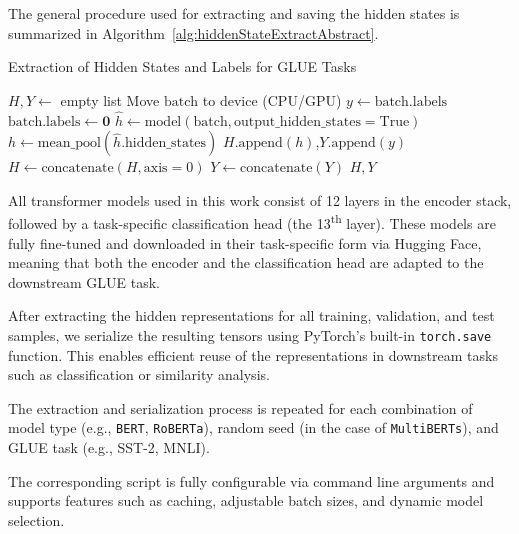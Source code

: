 The general procedure used for extracting and saving the hidden states is summarized in Algorithm~\ref{alg:hiddenStateExtractAbstract}.


\begin{algorithm}[H]
\caption{Extraction of Hidden States and Labels for GLUE Tasks}
\label{alg:hiddenStateExtractAbstract}
\begin{algorithmic}[htb]
  \State $H, Y \gets$ empty list
    \State Move $\text{batch}$ to device (CPU/GPU)
    \State $y \gets \text{batch.labels}$
    \State $\text{batch.labels} \gets \mathbf{0}$ 
    \State $\hat{h} \gets \text{model}(\text{batch}, \text{output\_hidden\_states}=\text{True})$
    \State $h \gets \text{mean\_pool}(\hat{h}.\text{hidden\_states})$ 
    \State $H.\text{append}(h)$,\quad $Y.\text{append}(y)$
  \EndFor
  \State $H \gets \text{concatenate}(H, \text{axis}=0)$ 
  \State $Y \gets \text{concatenate}(Y)$
  \State \Return $H, Y$
\EndProcedure
\end{algorithmic}
\end{algorithm}

All transformer models used in this work consist of 12 layers in the encoder stack, followed by a task-specific classification head (the 13\textsuperscript{th} layer). 
These models are fully fine-tuned and downloaded in their task-specific form via Hugging Face, meaning that both the encoder and the classification head are adapted to the downstream \ac{GLUE} task.



After extracting the hidden representations for all training, validation, and test samples, we serialize the resulting tensors using PyTorch's built-in \texttt{torch.save} function. 
This enables efficient reuse of the representations in downstream tasks such as classification or similarity analysis.

The extraction and serialization process is repeated for each combination of model type (e.g., \texttt{BERT}, \texttt{RoBERTa}), random seed (in the case of \texttt{MultiBERTs}), and \ac{GLUE} task (e.g., SST-2, MNLI).

The corresponding script is fully configurable via command line arguments and supports features such as caching, adjustable batch sizes, and dynamic model selection.

